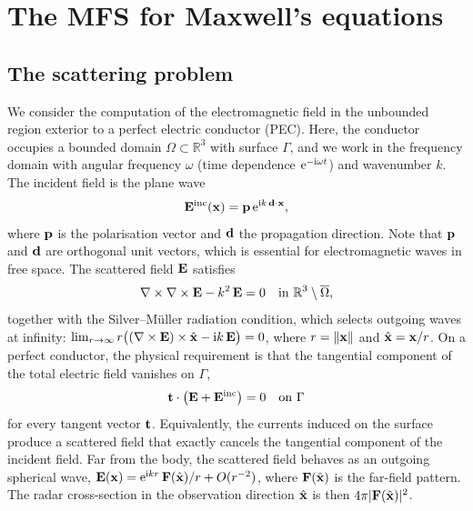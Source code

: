 \section{The MFS for Maxwell's equations}
\label{sec:method}

\subsection{The scattering problem}

We consider the computation of the electromagnetic field in the unbounded region exterior to a perfect electric conductor (PEC). Here, the conductor occupies a bounded domain $\Omega\subset\mathbb{R}^3$ with surface $\Gamma$, and we work in the frequency domain with angular frequency $\omega$ (time dependence $\mathrm{e}^{-\mathrm{i}\omega t}$) and wavenumber $k$. The incident field is the plane wave
\begin{equation}
  \mathbf{E}^{\mathrm{inc}}(\mathbf{x}) = \mathbf{p}\,\mathrm{e}^{\mathrm{i} k\,\mathbf{d}\cdot\mathbf{x}},
  \label{eq:planewave}
\end{equation}
where $\mathbf{p}$ is the polarisation vector and $\mathbf{d}$ the propagation direction. Note that $\mathbf{p}$ and $\mathbf{d}$ are orthogonal unit vectors, which is essential for electromagnetic waves in free space. The scattered field $\mathbf{E}$ satisfies \cite{kirsch2015,colton2013}
\begin{equation}
  \nabla\times\nabla\times\mathbf{E} - k^2\,\mathbf{E} = 0 \quad\text{in } \mathbb{R}^3\setminus\overline{\Omega},
  \label{eq:maxwell}
\end{equation}
together with the Silver--M\"uller radiation condition, which selects outgoing waves at infinity: $\lim_{r\to\infty} r\bigl((\nabla\times\mathbf{E})\times\hat{\mathbf{x}} - \mathrm{i} k\,\mathbf{E}\bigr) = 0$, where $r = \|\mathbf{x}\|$ and $\hat{\mathbf{x}} = \mathbf{x}/r$. On a perfect conductor, the physical requirement is that the tangential component of the total electric field vanishes on $\Gamma$,
\begin{equation}
  \mathbf{t}\cdot\bigl(\mathbf{E} + \mathbf{E}^{\mathrm{inc}}\bigr) = 0 \quad\text{on } \Gamma
  \label{eq:pec}
\end{equation}
for every tangent vector $\mathbf{t}$. Equivalently, the currents induced on the surface produce a scattered field that exactly cancels the tangential component of the incident field. Far from the body, the scattered field behaves as an outgoing spherical wave, $\mathbf{E}(\mathbf{x}) = \mathrm{e}^{\mathrm{i} kr}\,\mathbf{F}(\hat{\mathbf{x}})/r + O(r^{-2})$, where $\mathbf{F}(\hat{\mathbf{x}})$ is the far-field pattern. The radar cross-section in the observation direction $\hat{\mathbf{x}}$ is then $4\pi|\mathbf{F}(\hat{\mathbf{x}})|^2$.

